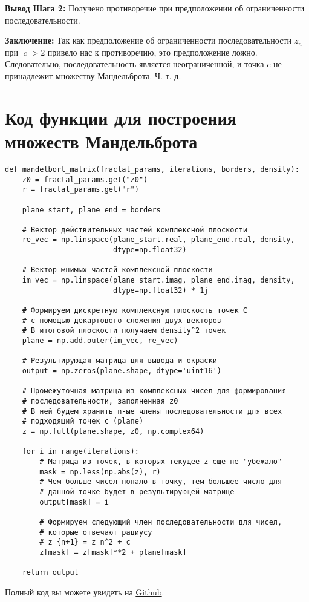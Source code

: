 \documentclass[a4paper,12pt]{article}
\begin{document}
\textbf{Вывод Шага 2:} Получено противоречие при предположении об ограниченности последовательности.

\textbf{Заключение:} Так как предположение об ограниченности последовательности $z_{n}$ при $|c|>2$ привело нас к противоречию, это предположение ложно. Следовательно, последовательность является неограниченной, и точка $c$ не принадлежит множеству Мандельброта. Ч. т. д.

\clearpage

\hypertarget{sec:4}{}
\section{\textbf{Код функции для построения множеств Мандельброта}}

\begin{lstlisting}[caption={Функция для построения множества Мандельброта}, label={lst:mandelbrot}]
def mandelbort_matrix(fractal_params, iterations, borders, density):
    z0 = fractal_params.get("z0") 
    r = fractal_params.get("r")
    
    plane_start, plane_end = borders
    
    # Вектор действительных частей комплексной плоскости
    re_vec = np.linspace(plane_start.real, plane_end.real, density,
                         dtype=np.float32)
    
    # Вектор мнимых частей комплексной плоскости
    im_vec = np.linspace(plane_start.imag, plane_end.imag, density,
                         dtype=np.float32) * 1j
                         
    # Формируем дискретную комплексную плоскость точек С
    # с помощью декартового сложения двух векторов
    # В итоговой плоскости получаем density^2 точек
    plane = np.add.outer(im_vec, re_vec)
    
    # Результирующая матрица для вывода и окраски
    output = np.zeros(plane.shape, dtype='uint16')
    
    # Промежуточная матрица из комплексных чисел для формирования
    # последовательности, заполненная z0
    # В ней будем хранить n-ые члены последовательности для всех
    # подходящий точек c (plane)
    z = np.full(plane.shape, z0, np.complex64) 
    
    for i in range(iterations):
        # Матрица из точек, в которых текущее z еще не "убежало"
        mask = np.less(np.abs(z), r)
        # Чем больше чисел попало в точку, тем большее число для
        # данной точке будет в результирующей матрице
        output[mask] = i
        
        # Формируем следующий член последовательности для чисел,
        # которые отвечают радиусу
        # z_{n+1} = z_n^2 + c
        z[mask] = z[mask]**2 + plane[mask]
        
    return output
\end{lstlisting}
Полный код вы можете увидеть на \href{https://github.com/Axe-On-You/tfkp-lab1}{Github}.
\end{document}
